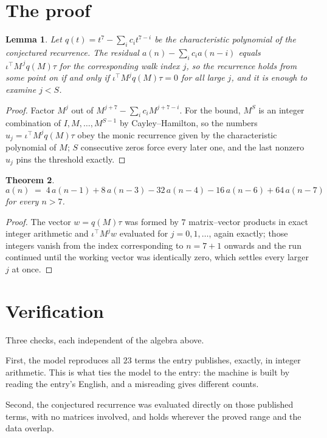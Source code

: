 \documentclass[11pt,a4paper]{article}
\theoremstyle{plain}
\newtheorem{theorem}{Theorem}
\newtheorem{lemma}[theorem]{Lemma}
\theoremstyle{definition}
\begin{document}
\section{The proof}

\begin{lemma}\label{lem:crit}
Let $q(t)=t^{7}-\sum_i c_it^{7-i}$ be the characteristic polynomial of the
conjectured recurrence. The residual $a(n)-\sum_ic_ia(n-i)$ equals
$\iota^{\!\top}M^{\,j}q(M)\tau$ for the corresponding walk index $j$, so the recurrence
holds from some point on if and only if $\iota^{\!\top}M^{j}q(M)\tau=0$ for all large $j$,
and it is enough to examine $j<S$.
\end{lemma}

\begin{proof}
Factor $M^{j}$ out of $M^{j+7}-\sum_ic_iM^{j+7-i}$. For the bound, $M^{S}$
is an integer combination of $I,M,\dots,M^{S-1}$ by Cayley--Hamilton, so the numbers
$u_j=\iota^{\!\top}M^{j}q(M)\tau$ obey the monic recurrence given by the characteristic
polynomial of $M$; $S$ consecutive zeros force every later one, and the last nonzero $u_j$
pins the threshold exactly.
\end{proof}

\begin{theorem}
\[
a(n)\;=\;4\,a(n-1) + 8\,a(n-3) - 32\,a(n-4) - 16\,a(n-6) + 64\,a(n-7)
\]
for every $n>7$.
\end{theorem}

\begin{proof}
The vector $w=q(M)\tau$ was formed by $7$ matrix--vector products in exact integer
arithmetic and $\iota^{\!\top}M^{j}w$ evaluated for $j=0,1,\dots$, again exactly; those
integers vanish from the index corresponding to $n=7+1$ onwards and the run continued
until the working vector was identically zero, which settles every larger $j$ at once.
\end{proof}

\section{Verification}

Three checks, each independent of the algebra above.

First, the model reproduces all $23$ terms the entry publishes, exactly, in integer
arithmetic. This is what ties the model to the entry: the machine is built by reading the
entry's English, and a misreading gives different counts.

Second, the conjectured recurrence was evaluated directly on those published terms, with no
matrices involved, and holds wherever the proved range and the data overlap.
\end{document}
